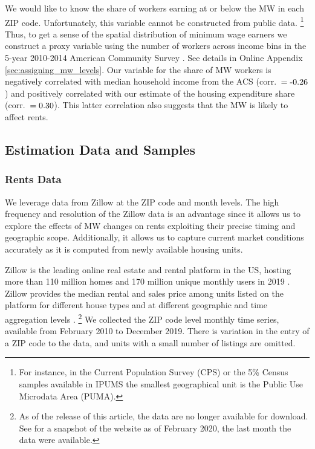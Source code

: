We would like to know the share of workers earning at or below the MW in each 
ZIP code.
Unfortunately, this variable cannot be constructed from public data.%
\footnote{For instance, in the Current Population Survey (CPS) or the 5\% 
	Census samples available in IPUMS the smallest geographical unit is the 
	Public Use Microdata Area (PUMA).}
Thus, to get a sense of the spatial distribution of minimum wage earners we 
construct a proxy variable using the number of workers across income bins
in the 5-year 2010-2014 American Community Survey \parencite[ACS;][]{CensusACS}.
See details in Online Appendix \ref{sec:assigning_mw_levels}.
Our variable for the share of MW workers is negatively correlated with median 
household income from the ACS (corr.\ $=\textnormal{-0.26}$) and 
positively correlated with our estimate of the housing expenditure share 
(corr.\ $=\textnormal{0.30}$).
This latter correlation also suggests that the MW is likely to affect rents.

\subsection{Estimation Data and Samples}

\subsubsection{Rents Data}
\label{sec:data_rents}

We leverage data from Zillow at the ZIP code and month levels.
The high frequency and resolution of the Zillow data is an advantage since it 
allows us to explore the effects of MW changes on rents exploiting their precise
timing and geographic scope.
Additionally, it allows us to capture current market conditions accurately as it
is computed from newly available housing units.

Zillow is the leading online real estate and rental platform in the US, hosting
more than 110 million homes and 170 million unique monthly users in 2019 
\parencite{ZillowFacts}.
Zillow provides the median rental and sales price among units listed on the 
platform for different house types and at different geographic and time 
aggregation levels \parencite{ZillowData}.%
\footnote{As of the release of this article, the data are no longer available 
    for download.
    See \textcite{ZillowDataArchive} for a snapshot of the website as of 
    February 2020, the last month the data were available.}
We collected the ZIP code level monthly time series, available from February 
2010 to December 2019.
There is variation in the entry of a ZIP code to the data, and units with a 
small number of listings are omitted. %

